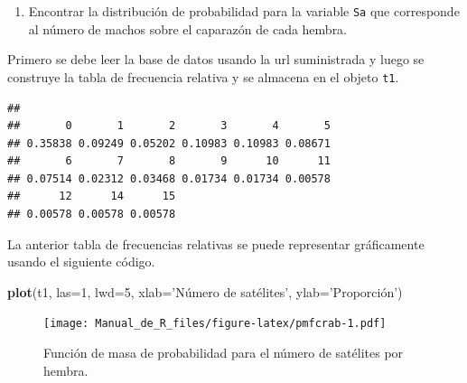 \documentclass[10pt,]{krantz}
\makeatletter
\newenvironment{Shaded}{\begin{snugshade}}{\end{snugshade}}
\newcommand{\KeywordTok}[1]{\textcolor[rgb]{0.13,0.29,0.53}{\textbf{#1}}}
\newcommand{\DataTypeTok}[1]{\textcolor[rgb]{0.13,0.29,0.53}{#1}}
\newcommand{\DecValTok}[1]{\textcolor[rgb]{0.00,0.00,0.81}{#1}}
\newcommand{\StringTok}[1]{\textcolor[rgb]{0.31,0.60,0.02}{#1}}
\newcommand{\OperatorTok}[1]{\textcolor[rgb]{0.81,0.36,0.00}{\textbf{#1}}}
\newcommand{\NormalTok}[1]{#1}
\providecommand{\tightlist}{%
  \setlength{\itemsep}{0pt}\setlength{\parskip}{0pt}}
\newenvironment{kframe}{%
\medskip{}
\setlength{\fboxsep}{.8em}
 \def\at@end@of@kframe{}%
 \ifinner\ifhmode%
  \def\at@end@of@kframe{\end{minipage}}%
  \begin{minipage}{\columnwidth}%
 \fi\fi%
 \def\FrameCommand##1{\hskip\@totalleftmargin \hskip-\fboxsep
 \colorbox{shadecolor}{##1}\hskip-\fboxsep
     \hskip-\linewidth \hskip-\@totalleftmargin \hskip\columnwidth}%
 \MakeFramed {\advance\hsize-\width
   \@totalleftmargin\z@ \linewidth\hsize
   \@setminipage}}%
 {\par\unskip\endMakeFramed%
 \at@end@of@kframe}
\renewenvironment{Shaded}{\begin{kframe}}{\end{kframe}}
\makeatother
\begin{document}
\begin{enumerate}
\def\labelenumi{\arabic{enumi})}
\tightlist
\item
  Encontrar la distribución de probabilidad para la variable \texttt{Sa}
  que corresponde al número de machos sobre el caparazón de cada hembra.
\end{enumerate}

Primero se debe leer la base de datos usando la url suministrada y luego
se construye la tabla de frecuencia relativa y se almacena en el objeto
\texttt{t1}.

\begin{Shaded}
\end{Shaded}

\begin{verbatim}
## 
##       0       1       2       3       4       5 
## 0.35838 0.09249 0.05202 0.10983 0.10983 0.08671 
##       6       7       8       9      10      11 
## 0.07514 0.02312 0.03468 0.01734 0.01734 0.00578 
##      12      14      15 
## 0.00578 0.00578 0.00578
\end{verbatim}

La anterior tabla de frecuencias relativas se puede representar
gráficamente usando el siguiente código.

\begin{Shaded}
\begin{Highlighting}[]
\KeywordTok{plot}\NormalTok{(t1, }\DataTypeTok{las=}\DecValTok{1}\NormalTok{, }\DataTypeTok{lwd=}\DecValTok{5}\NormalTok{, }\DataTypeTok{xlab=}\StringTok{'Número de satélites'}\NormalTok{,}
     \DataTypeTok{ylab=}\StringTok{'Proporción')}
\end{Highlighting}
\end{Shaded}

\begin{figure}
\centering
\texttt{[image: Manual\_de\_R\_files/figure-latex/pmfcrab-1.pdf]}
\caption{\label{fig:pmfcrab}Función de masa de probabilidad para el número
de satélites por hembra.}
\end{figure}
\end{document}
